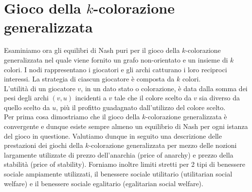 \chapter{Gioco della \(k\)-colorazione generalizzata}
\justify
Esaminiamo ora gli equilibri di Nash puri per il gioco della \(k\)-colorazione generalizzata nel quale viene fornito un grafo non-orientato e un insieme di \(k\) colori. I nodi rappresentano i giocatori e gli archi catturano i loro reciproci interessi. La strategia di ciascun giocatore è composta da \(k\) colori.\\
L'utilità di un giocatore \(v\), in un dato stato o colorazione, è data dalla somma dei pesi degli archi \((v, u)\) incidenti a \(v\) tale che il colore scelto da \(v\) sia diverso da quello scelto da \(u\), più il profitto guadagnato dall'utilizzo del colore scelto.\\
Per prima cosa dimostriamo che il gioco della \(k\)-colorazione generalizzata è convergente e dunque esiste sempre almeno un equilibrio di Nash per ogni istanza del gioco in questione. Valutiamo dunque in seguito una descrizione delle prestazioni dei giochi della \(k\)-colorazione generalizzata per mezzo delle nozioni largamente utilizzate di prezzo dell'anarchia (price of anarchy) e prezzo della stabilità (price of stability). Forniamo inoltre limiti stretti per 2 tipi di benessere sociale ampiamente utilizzati, il benessere sociale utilitario (utilitarian social welfare) e il benessere sociale egalitario (egalitarian social welfare).\\

